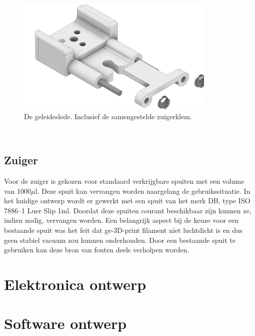 \begin{minipage}[t]{0.59\textwidth}
    \vspace{0pt}
    \begin{figure}[H]
        \centering
        \includegraphics[width=0.85\textwidth]{figures/CarriageAndClamp.png}
        \caption{De geleideslede. Inclusief de samengestelde zuigerklem.}\label{fig:CarriageAndClamp}
    \end{figure}
\end{minipage}\\

\subsection{Zuiger}
Voor de zuiger is gekozen voor standaard verkrijgbare spuiten met een volume van 1000$\mu$l. Deze spuit kan vervangen worden naargelang de gebruikssituatie. In het huidige ontwerp wordt er gewerkt met een spuit van het merk DB, type ISO 7886--1 Luer Slip 1ml. Doordat deze spuiten courant beschikbaar zijn kunnen ze, indien nodig, vervangen worden.
Een belangrijk aspect bij de keuze voor een bestaande spuit was het feit dat ge-3D-print filament niet luchtdicht is en dus geen stabiel vacuum zou kunnen onderhouden. Door een bestaande spuit te gebruiken kan deze bron van fouten deels verholpen worden.

\section{Elektronica ontwerp}
\section{Software ontwerp}

